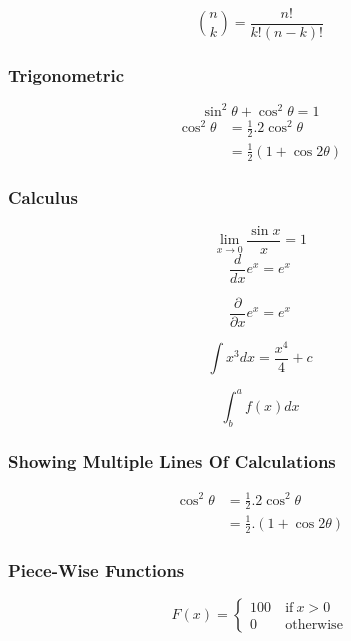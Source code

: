 \documentclass[a4paper, 12pt]{article}
\begin{document}
		\begin{equation}
			\binom{n}{k} = \frac{n!}{k!(n-k)!}
		\end{equation}
				
	\subsubsection{Trigonometric}
		\begin{equation}
			\sin^2\theta + \cos^2\theta = 1
		\end{equation}
		\begin{align*}
			\cos^2\theta & = \frac{1}{2}.2\cos^2\theta\\
			& = \frac{1}{2}(1+\cos2\theta)
		\end{align*}
	
	\subsubsection{Calculus}
		\begin{equation}
			\lim_{x \to 0}	\frac{\sin x}{x} = 1
		\end{equation}
		\begin{equation}
			\frac{d}{dx}e^x = e^x			
		\end{equation}
		
		\begin{equation}
		\frac{\partial}{\partial x}e^x = e^x			
		\end{equation}
		
		\begin{equation}
			\int x^3 dx = \frac{x^4}{4} + c			
		\end{equation}
		
		\begin{equation}
			\int_b^a f(x)dx
		\end{equation}
	\subsubsection{Showing Multiple Lines Of Calculations}
		\begin{align*}
			\cos^2\theta & = 
			\frac{1}{2}.2\cos^2\theta\\
			& = \frac{1}{2}.(1 + \cos 2\theta)
		\end{align*}
		\subsubsection{Piece-Wise Functions}
		\begin{equation}
			F(x) =
			\begin{cases}
			100 \ & \text{if} \ x > 0 \\0 \ & \text{otherwise}
			\end{cases} 
		\end{equation}				
		
\end{document}
